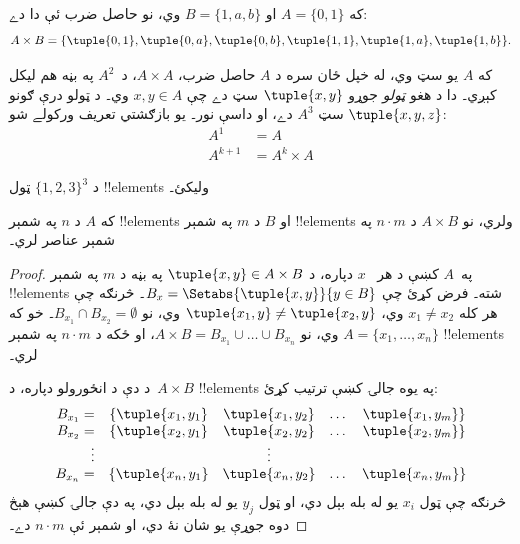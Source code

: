 \documentclass[../../../include/open-logic-section]{subfiles}
\begin{document}
\begin{ex}
که $A = \{0, 1\}$ او $B = \{1, a, b\}$ وي، نو حاصل ضرب ئې دا دے:
\[
A \times B = \{ \tuple{0, 1}, \tuple{0, a}, \tuple{0, b},
    \tuple{1, 1}, \tuple{1, a}, \tuple{1, b} \}.
\]
\end{ex}

\begin{ex}
که $A$ يو سټ وي، له خپل ځان سره د $A$ حاصل ضرب، $A \times A$، د~$A^2$ په بڼه هم ليکل کېږي۔ دا د هغو \emph{ټولو} جوړو $\tuple{x, y}$ سټ دے چې $x, y \in A$ وي۔ د ټولو درې ګونو $\tuple{x, y, z}$ سټ $A^3$ دے، او داسې نور۔ يو بازګشتي تعريف ورکولے شو:
\begin{align*}
  A^1 & = A\\
  A^{k+1} & = A^k \times A
\end{align*}
\end{ex}

\begin{prob}
د $\{1, 2, 3\}^3$ ټول !!{element}s وليکئ۔
\end{prob}

\begin{prop}
که $A$ د $n$ په شمېر !!{element}s او $B$ د $m$ په شمېر !!{element}s ولري، نو $A \times B$ د $n\cdot m$ په شمېر عناصر لري۔
\end{prop}

\begin{proof}
په~$A$ کښې د هر ~$x$ دپاره، د $\tuple{x, y} \in A \times B$ په بڼه د $m$ په شمېر !!{element}s شته۔ فرض کړئ چې $B_x = \Setabs{\tuple{x, y}}{y \in B}$۔ څرنګه چې هر کله $x_1 \neq x_2$ وي، $\tuple{x_1, y} \neq \tuple{x_2, y}$ وي، نو $B_{x_1} \cap B_{x_2} = \emptyset$۔ خو که $A = \{x_1, \dots, x_n\}$ وي، نو $A \times B = B_{x_1} \cup \dots \cup B_{x_n}$، او ځکه د $n\cdot m$ په شمېر !!{element}s لري۔

د دې د انځورولو دپاره، د~$A \times B$ !!{element}s په يوه جالۍ کښې ترتيب کړئ:
\[
\begin{array}{rcccc}
  B_{x_1} = & \{\tuple{x_1, y_1} & \tuple{x_1, y_2} & \dots & \tuple{x_1, y_m}\}\\
  B_{x_2} = & \{\tuple{x_2, y_1} & \tuple{x_2, y_2} & \dots & \tuple{x_2, y_m}\}\\
  \vdots & & \vdots\\
  B_{x_n} = & \{\tuple{x_n, y_1} & \tuple{x_n, y_2} & \dots & \tuple{x_n, y_m}\}
\end{array}
\]
څرنګه چې ټول $x_i$ يو له بله بېل دي، او ټول $y_j$ يو له بله بېل دي، په دې جالۍ کښې هېڅ دوه جوړې يو شان نۀ دي، او شمېر ئې $n\cdot m$ دے۔
\end{proof}
\end{document}
